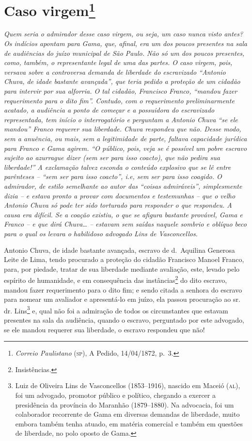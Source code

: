 \chapter{Caso virgem\footnote{\emph{Correio Paulistano} (\textsc{sp}), A Pedido, 14/04/1872,
  p.~3.}} %

\begin{didascalia}
\emph{Quem seria o admirador desse caso virgem, ou seja, um caso nunca
visto antes? Os indícios apontam para Gama, que, afinal, era um dos
poucos presentes na sala de audiências do juízo municipal de São Paulo.
Não só um dos poucos presentes, como, também, o representante legal de
uma das partes. O caso virgem, pois, versava sobre a controversa demanda
de liberdade do escravizado ``Antonio Chuva, de idade bastante avançada'',
que teria pedido a proteção de um cidadão para intervir por sua
alforria. O tal cidadão, Francisco Franco, ``mandou fazer requerimento
para o dito fim''. Contudo, com o requerimento preliminarmente acatado, a
audiência a ponto de começar e a possuidora do escravizado representada,
tem início o interrogatório e perguntam a Antonio Chuva ``se ele mandou''
Franco requerer sua liberdade. Chuva respondeu que não. Desse modo, sem
a anuência, ou mais, sem a legitimidade de parte, faltava capacidade
jurídica para Franco e Gama agirem. ``O público, pois, veja se é possível
um pobre escravo sujeito ao azurrague dizer (sem ser para isso coacto),
que não pedira sua liberdade!'' A exclamação talvez esconda o conteúdo
explosivo que se lê entre parênteses -- ``sem ser para isso coacto'', i.e,
sem ser para isso coagido. O admirador, de estilo semelhante ao autor
das ``coisas admiráveis'', simplesmente dizia -- e estava pronto a provar
com documentos e testemunhas -- que o velho Antonio Chuva só pode ter
sido torturado para responder o que respondeu. A causa era difícil. Se a
coação existiu, o que se afigura bastante provável, Gama e Franco -- e
que dirá Chuva\ldots{} -- estavam sem saídas naquele sombrio e oblíquo beco
para o qual os levara o habilidoso advogado Lins de Vasconcellos.}
\end{didascalia}

Antonio Chuva, de idade bastante avançada, escravo de d.~Aquilina
Generosa Leite de Lima, tendo procurado a proteção do cidadão Francisco
Manoel Franco, para, por piedade, tratar de sua liberdade mediante
avaliação, este, levado pelo espírito de humanidade, e em consequência
das instâncias\footnote{ Insistências.} do dito escravo, mandou fazer
requerimento para o dito fim; e sendo citada a senhora do escravo para
nomear um avaliador e apresentá-lo em juízo, ela passou procuração ao
sr. dr. Lins\footnote{ Luiz de Oliveira Lins de Vasconcellos
  (1853--1916), nascido em Maceió (\textsc{al}), foi um advogado, promotor público
  e político, chegando a exercer a presidência da província do Maranhão
  (1879--1880). Na advocacia, foi um colaborador recorrente de Gama em
  diversas demandas de liberdade, muito embora também tenha atuado, em
  matéria comercial e também em questões de liberdade, no polo oposto de
  Gama.} e, qual não foi a admiração de todos os circunstantes que
estavam presentes na sala da audiência, quando o escravo, perguntado por
este advogado, se ele mandou requerer sua liberdade, o escravo respondeu
que não!

